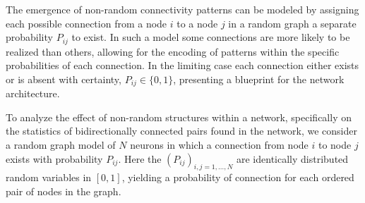 






The emergence of non-random connectivity patterns can be modeled by
assigning each possible connection from a node $i$ to a node $j$ in a
random graph a separate probability $P_{ij}$ to exist.
%
In such a model some connections are more likely to be realized than
others, allowing for the encoding of patterns within the specific
probabilities of each connection.
%
In the limiting case each connection either exists or is absent with
certainty, $P_{ij} \in \{0,1\}$, presenting a blueprint for the
network architecture.
%

%
To analyze the effect of non-random structures within a network,
specifically on the statistics of bidirectionally connected pairs
found in the network, we consider a random graph model of $N$ neurons
in which a connection from node $i$ to node $j$ exists with
probability $P_{ij}$.
%
Here the $(P_{ij})_{i,j=1,\dots,N}$ are identically distributed random
variables in $[0,1]$, yielding a probability of connection for each
ordered pair of nodes in the graph.
%

